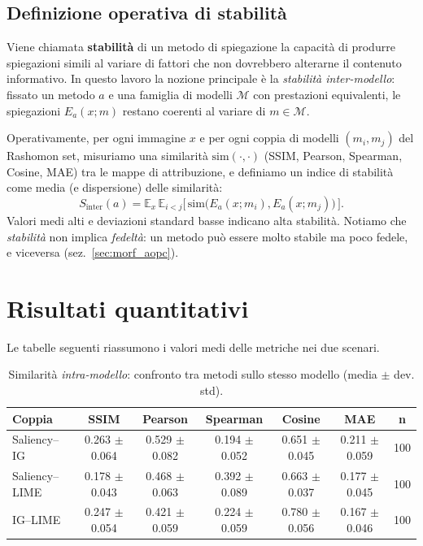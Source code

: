 \documentclass[12pt,a4paper,oneside]{report}
\numberwithin{figure}{chapter}
\numberwithin{table}{chapter}
\begin{document}
\subsection{Definizione operativa di stabilità}
\label{sec:stabilita}
Viene chiamata \textbf{stabilità} di un metodo di spiegazione la capacità di
produrre spiegazioni simili al variare di fattori che non dovrebbero alterarne
il contenuto informativo. In questo lavoro la nozione principale è la
\emph{stabilità inter-modello}: fissato un metodo
$a$ e una famiglia di modelli $\mathcal{M}$ con prestazioni equivalenti, le
spiegazioni $E_a(x;m)$ restano coerenti al variare di $m \in \mathcal{M}$.

Operativamente, per ogni immagine $x$ e per ogni coppia di modelli $(m_i,m_j)$
del Rashomon set, misuriamo una similarità $\mathrm{sim}(\cdot,\cdot)$ (SSIM,
Pearson, Spearman, Cosine, MAE) tra le mappe di attribuzione, e definiamo un
indice di stabilità come media (e dispersione) delle similarità:
\[
      S_{\text{inter}}(a)
      = \mathbb{E}_{x}\,\mathbb{E}_{i<j}\big[\,\mathrm{sim}\big(E_a(x;m_i),E_a(x;m_j)\big)\,\big].
\]
Valori medi alti e deviazioni standard basse indicano alta stabilità. Notiamo
che \emph{stabilità} non implica \emph{fedeltà}: un metodo può essere molto
stabile ma poco fedele, e viceversa (sez.~\ref{sec:morf_aopc}).

\section{Risultati quantitativi}
Le tabelle seguenti riassumono i valori medi delle metriche nei due scenari.

\FloatBarrier
{}

\begin{table}[H]
      \centering
      \renewcommand{\arraystretch}{1.05}
      \begin{adjustbox}{max width=\linewidth}
            \begin{tabular}{lccccc c}
                  \hline
                  \textbf{Coppia} & \textbf{SSIM}     & \textbf{Pearson}  & \textbf{Spearman} & \textbf{Cosine}   & \textbf{MAE}      & \textbf{n} \\
                  \hline
                  Saliency–IG     & 0.263 $\pm$ 0.064 & 0.529 $\pm$ 0.082 & 0.194 $\pm$ 0.052 & 0.651 $\pm$ 0.045 & 0.211 $\pm$ 0.059 & 100        \\
                  Saliency–LIME   & 0.178 $\pm$ 0.043 & 0.468 $\pm$ 0.063 & 0.392 $\pm$ 0.089 & 0.663 $\pm$ 0.037 & 0.177 $\pm$ 0.045 & 100        \\
                  IG–LIME         & 0.247 $\pm$ 0.054 & 0.421 $\pm$ 0.059 & 0.224 $\pm$ 0.059 & 0.780 $\pm$ 0.056 & 0.167 $\pm$ 0.046 & 100        \\
                  \hline
            \end{tabular}
      \end{adjustbox}
      \caption{Similarità \emph{intra-modello}: confronto tra metodi sullo stesso modello (media $\pm$ dev. std).}
      \label{tab:sim_intra}
\end{table}
\end{document}
